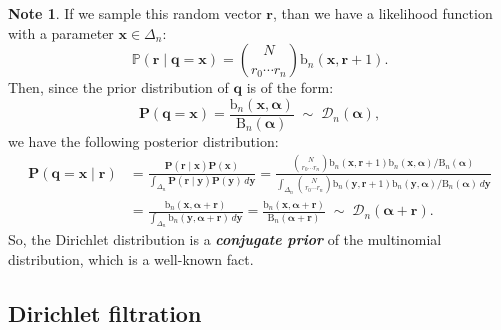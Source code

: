 \documentclass[12pt, a4paper]{amsart}
\theoremstyle{plain}
\theoremstyle{definition}
\newtheorem{Note}[thm]{Note}
\numberwithin{figure}{section}
\numberwithin{table}{section}
\newcommand{\newword}[1]{\textbf{\textit{#1}}}
\numberwithin{equation}{section}
\begin{document}
\begin{Note}
If we sample this random vector
$
\mathbf{r}
$, than we have
a likelihood function
with a parameter
$
\mathbf{x}
	\in
\Delta_n
$:
\begin{equation}
\label{eq:multiLikelifood}
\mathbb{P}(
	\mathbf{r}
\mid
	\mathbf{q}
		=
	\mathbf{x}
)
			=
\binom{N}{r_0 \cdots r_n}
\mathrm{b}_n(
	\mathbf{x},
	\mathbf{r} + 1
) .
\end{equation}
Then, since the prior distribution of
$\mathbf{q}$
is of the form:
\begin{equation}
\label{eq:qDistDiri}
\mathbf{P}(
	\mathbf{q}
		=
	\mathbf{x}
)
			=
\frac{
	\mathrm{b}_n(
		\mathbf{x},
		\boldsymbol{\alpha}
	)
}{
	\mathrm{B}_n(
		\boldsymbol{\alpha}
	)
}
			\; \sim \;
\mathcal{D}_n(
		\boldsymbol{\alpha}
) ,
\end{equation}
we have the following posterior distribution:
\begin{align}
\mathbf{P}(
	\mathbf{q}
		=
	\mathbf{x}
\mid
	\mathbf{r}
)
			&=
\frac{
	\mathbf{P}(
		\mathbf{r}
	\mid
		\mathbf{x}
	)
	\mathbf{P}(
		\mathbf{x}
	)
}{
	\int_{\Delta_n}
	\mathbf{P}(
		\mathbf{r}
	\mid
		\mathbf{y}
	)
	\mathbf{P}(
		\mathbf{y}
	)
	\,
	d \mathbf{y}
}
			=
\frac{
	\binom{N}{r_0 \cdots r_n}
	\mathrm{b}_n(
		\mathbf{x},
		\mathbf{r} + 1
	)
	\mathrm{b}_n(
		\mathbf{x},
		\boldsymbol{\alpha}
	)
		/
	\mathrm{B}_n(
		\boldsymbol{\alpha}
	)
}{
  \int_{\Delta_n}
	\binom{N}{r_0 \cdots r_n}
	\mathrm{b}_n(
		\mathbf{y},
		\mathbf{r} + 1
	)
	\mathrm{b}_n(
		\mathbf{y},
		\boldsymbol{\alpha}
	)
		/
	\mathrm{B}_n(
		\boldsymbol{\alpha}
	)
  \, d \mathbf{y}
}
			\nonumber
			\\&=
\frac{
	\mathrm{b}_n(
		\mathbf{x},
		\boldsymbol{\alpha}
			+
		\mathbf{r}
	)
}{
  \int_{\Delta_n}
	\mathrm{b}_n(
		\mathbf{y},
		\boldsymbol{\alpha}
			+
		\mathbf{r}
	)
  \, d \mathbf{y}
}
			\nonumber
			=
\frac{
	\mathrm{b}_n(
		\mathbf{x},
		\boldsymbol{\alpha}
			+
		\mathbf{r}
	)
}{
	\mathrm{B}_n(
		\boldsymbol{\alpha}
			+
		\mathbf{r}
	)
}
			\; \sim \;
\mathcal{D}_n(
		\boldsymbol{\alpha}
			+
		\mathbf{r}
) .
\end{align}
So, 
the Dirichlet distribution is a \newword{conjugate prior} of the multinomial distribution,
which is a well-known fact.

\end{Note}




\subsection{Dirichlet filtration}
\label{sec:dirichletFilt}
\end{document}
